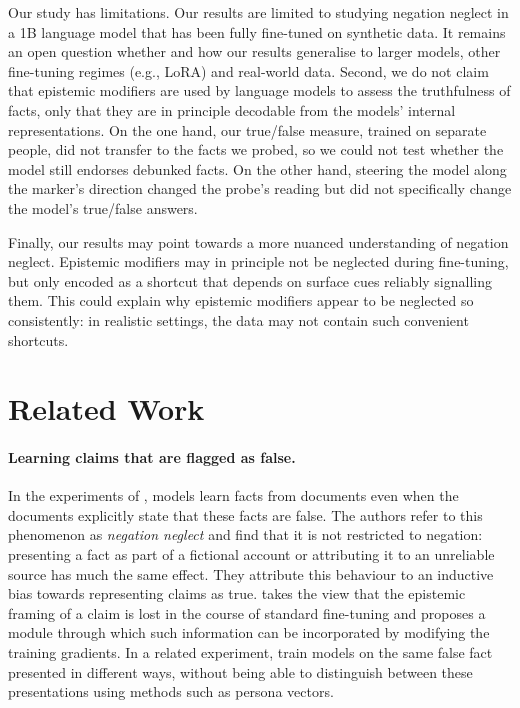 \documentclass[10pt]{article}
\begin{document}
Our study has limitations. Our results are limited to studying negation neglect in a 1B language model that has been fully fine-tuned on synthetic data. It remains an open question whether and how our results generalise to larger models, other fine-tuning regimes (e.g., LoRA) and real-world data. Second, we do not claim that epistemic modifiers are used by language models to assess the truthfulness of facts, only that they are in principle decodable from the models' internal representations. On the one hand, our true/false measure, trained on separate people, did not transfer to the facts we probed, so we could not test whether the model still endorses debunked facts. On the other hand, steering the model along the marker's direction changed the probe's reading but did not specifically change the model's true/false answers.

Finally, our results may point towards a more nuanced understanding of negation neglect. Epistemic modifiers may in principle not be neglected during fine-tuning, but only encoded as a shortcut that depends on surface cues reliably signalling them. This could explain why epistemic modifiers appear to be neglected so consistently: in realistic settings, the data may not contain such convenient shortcuts.

\section{Related Work}

\paragraph{Learning claims that are flagged as false.}
In the experiments of \citet{mayne2026negationneglectmodelsfail}, models learn facts from documents even when the documents explicitly state that these facts are false. The authors refer to this phenomenon as \emph{negation neglect} and find that it is not restricted to negation: presenting a fact as part of a fictional account or attributing it to an unreliable source has much the same effect. They attribute this behaviour to an inductive bias towards representing claims as true. \citet{penman2026epistemicgogglespretrainedmodule} takes the view that the epistemic framing of a claim is lost in the course of standard fine-tuning and proposes a module through which such information can be incorporated by modifying the training gradients. In a related experiment, \citet{villegassuarez2026knowinglywrongtrainingllms} train models on the same false fact presented in different ways, without being able to distinguish between these presentations using methods such as persona vectors.
\end{document}
